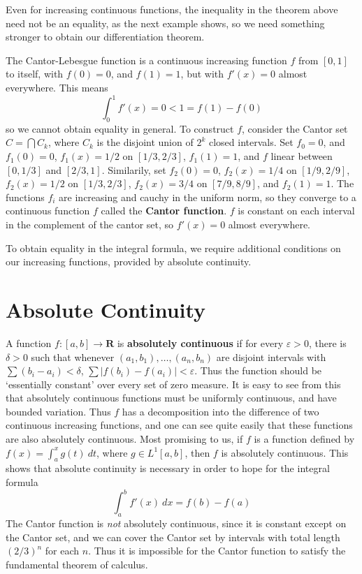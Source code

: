 Even for increasing continuous functions, the inequality in the theorem above need not be an equality, as the next example shows, so we need something stronger to obtain our differentiation theorem.

\begin{example}
  The Cantor-Lebesgue function is a continuous increasing function $f$ from $[0,1]$ to itself, with $f(0) = 0$, and $f(1) = 1$, but with $f'(x) = 0$ almost everywhere. This means
  \[ \int_0^1 f'(x) = 0 < 1 = f(1) - f(0) \]
  so we cannot obtain equality in general. To construct $f$, consider the Cantor set $C = \bigcap C_k$, where $C_k$ is the disjoint union of $2^k$ closed intervals. Set $f_0 = 0$, and $f_1(0) = 0$, $f_1(x) = 1/2$ on $[1/3,2/3]$, $f_1(1) = 1$, and $f$ linear between $[0,1/3]$ and $[2/3,1]$. Similarily, set $f_2(0) = 0$, $f_2(x) = 1/4$ on $[1/9, 2/9]$, $f_2(x) = 1/2$ on $[1/3,2/3]$, $f_2(x) = 3/4$ on $[7/9,8/9]$, and $f_2(1) = 1$. The functions $f_i$ are increasing and cauchy in the uniform norm, so they converge to a continuous function $f$ called the {\bf Cantor function}. $f$ is constant on each interval in the complement of the cantor set, so $f'(x) = 0$ almost everywhere.
\end{example}

To obtain equality in the integral formula, we require additional conditions on our increasing functions, provided by absolute continuity.

\section{Absolute Continuity}

A function $f: [a,b] \to \mathbf{R}$ is {\bf absolutely continuous} if for every $\varepsilon > 0$, there is $\delta > 0$ such that whenever $(a_1, b_1), \dots, (a_n,b_n)$ are disjoint intervals with $\sum (b_i - a_i) < \delta$, $\sum |f(b_i) - f(a_i)| < \varepsilon$. Thus the function should be `essentially constant' over every set of zero measure. It is easy to see from this that absolutely continuous functions must be uniformly continuous, and have bounded variation. Thus $f$ has a decomposition into the difference of two continuous increasing functions, and one can see quite easily that these functions are also absolutely continuous. Most promising to us, if $f$ is a function defined by $f(x) = \int_a^x g(t)\ dt$, where $g \in L^1[a,b]$, then $f$ is absolutely continuous. This shows that absolute continuity is necessary in order to hope for the integral formula
%
\[ \int_a^b f'(x)\ dx = f(b) - f(a) \]
%
The Cantor function is {\it not} absolutely continuous, since it is constant except on the Cantor set, and we can cover the Cantor set by intervals with total length $(2/3)^n$ for each $n$. Thus it is impossible for the Cantor function to satisfy the fundamental theorem of calculus.

